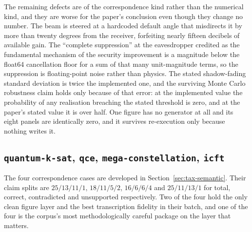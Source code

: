 \documentclass[sigconf,review]{acmart}
\newcommand{\pkg}[1]{\texttt{#1}}
\begin{document}
The remaining defects are of the correspondence kind rather than the numerical
kind, and they are worse for the paper's conclusion even though they change
no number. The beam is steered at a hardcoded default angle that misdirects it
by more than twenty degrees from the receiver, forfeiting nearly fifteen
decibels of available gain. The ``complete suppression'' at the eavesdropper
credited as the fundamental mechanism of the security improvement is a
magnitude below the float64 cancellation floor for a sum of that many
unit-magnitude terms, so the suppression is floating-point noise rather than
physics. The stated shadow-fading standard deviation is twice the implemented
one, and the surviving Monte Carlo robustness claim holds only because of that
error: at the implemented value the probability of any realisation breaching
the stated threshold is zero, and at the paper's stated value it is over
half. One figure has no generator at all and its eight panels are identically
zero, and it survives re-execution only because nothing writes it.

\subsection{\pkg{quantum-k-sat}, \pkg{qce}, \pkg{mega-constellation}, \pkg{icft}}
\label{sec:case-semantic}

The four correspondence cases are developed in
Section~\ref{sec:tax-semantic}. Their claim splits are $25/13/11/1$,
$18/11/5/2$, $16/6/6/4$ and $25/11/13/1$ for total, correct, contradicted and
unsupported respectively. Two of the four hold the only clean figure layer and
the best transcription fidelity in their batch, and one of the four is the
corpus's most methodologically careful package on the layer that matters.
\end{document}
